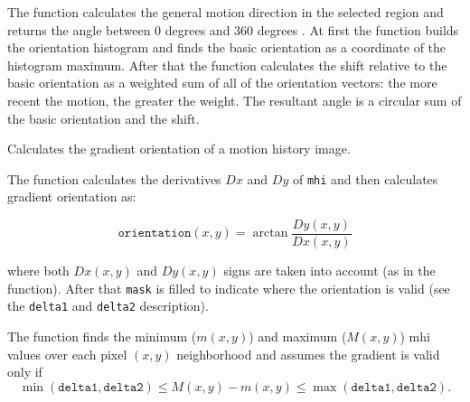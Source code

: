 The function calculates the general
motion direction in the selected region and returns the angle between
0 degrees  and 360 degrees . At first the function builds the orientation histogram
and finds the basic orientation as a coordinate of the histogram
maximum. After that the function calculates the shift relative to the
basic orientation as a weighted sum of all of the orientation vectors: the more
recent the motion, the greater the weight. The resultant angle is
a circular sum of the basic orientation and the shift.

Calculates the gradient orientation of a motion history image.


\begin{description}
\end{description}

The function calculates the derivatives $Dx$ and $Dy$ of \texttt{mhi} and then calculates gradient orientation as:

\[
\texttt{orientation}(x,y)=\arctan{\frac{Dy(x,y)}{Dx(x,y)}}
\]

where both $Dx(x,y)$ and $Dy(x,y)$ signs are taken into account (as in the  function). After that \texttt{mask} is filled to indicate where the orientation is valid (see the \texttt{delta1} and \texttt{delta2} description).

The function finds the minimum ($m(x,y)$) and maximum ($M(x,y)$) mhi values over each pixel $(x,y)$ neighborhood and assumes the gradient is valid only if
\[
\min(\texttt{delta1} , \texttt{delta2} ) \le M(x,y)-m(x,y) \le \max(\texttt{delta1} ,\texttt{delta2} ).
\]

